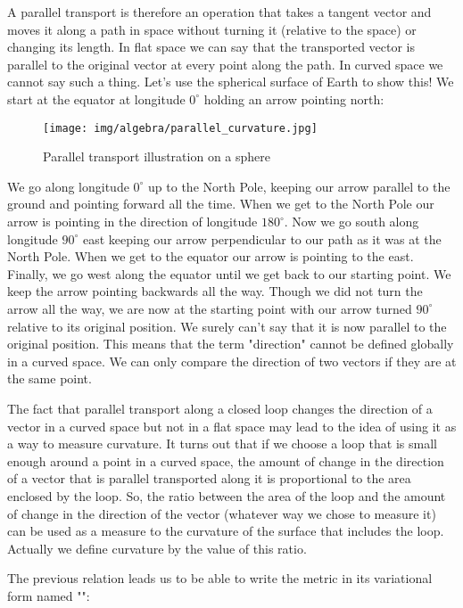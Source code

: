 	A parallel transport is therefore an operation that takes a tangent vector and moves it along a path in space without turning it (relative to the space) or changing its length. In flat space we can say that the transported vector is parallel to the original vector at every point along the path. In curved space we cannot say such a thing. Let's use the spherical surface of Earth to show this! We start at the equator at longitude $0^\circ$ holding an arrow pointing north:
	\begin{figure}[H]
		\centering
		\texttt{[image: img/algebra/parallel\_curvature.jpg]}
		\caption{Parallel transport illustration on a sphere}
	\end{figure}
	We go along longitude $0^\circ$ up to the North Pole, keeping our arrow parallel to the ground and pointing forward all the time. When we get to the North Pole our arrow is pointing in the direction of longitude $180^\circ$. Now we go south along longitude $90^\circ$ east keeping our arrow perpendicular to our path as it was at the North Pole. When we get to the equator our arrow is pointing to the east. Finally, we go west along the equator until we get back to our starting point. We keep the arrow pointing backwards all the way. Though we did not turn the arrow all the way, we are now at the starting point with our arrow turned $90^\circ$ relative to its original position. We surely can't say that it is now parallel to the original position. This means that the term "direction" cannot be defined globally in a curved space. We can only compare the direction of two vectors if they are at the same point.

	The fact that parallel transport along a closed loop changes the direction of a vector in a curved space but not in a flat space may lead to the idea of using it as a way to measure curvature. It turns out that if we choose a loop that is small enough around a point in a curved space, the amount of change in the direction of a vector that is parallel transported along it is proportional to the area enclosed by the loop. So, the ratio between the area of the loop and the amount of change in the direction of the vector (whatever way we chose to measure it) can be used as a measure to the curvature of the surface that includes the loop. Actually we define curvature by the value of this ratio.
	
	The previous relation leads us to be able to write the metric in its variational form named "":
	
